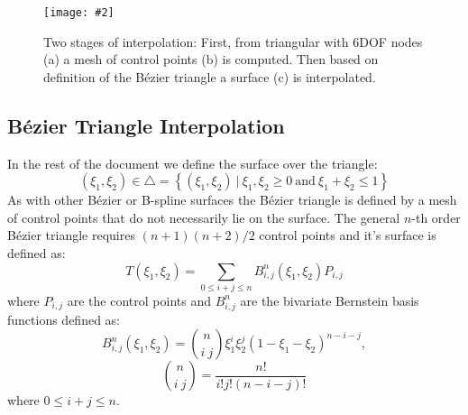\documentclass{egpubl}
\newcommand{\FigureW}[3]{%
\begin{figure*}[htb]
  \centering
  \texttt{[image: \#2]}
  \caption{\label{fig-#2}#3}
\end{figure*}}
\begin{document}
\FigureW{0.8\linewidth}{stages}
{Two stages of interpolation: First, from triangular with 6DOF nodes (a) a mesh of control points (b) is computed.
Then based on definition of the B\'ezier triangle a surface (c) is interpolated.}

\subsection{B\'ezier Triangle Interpolation} %

In the rest of the document we define the surface over the triangle:
%
\begin{equation}
    (\xi_1,\xi_2) \in \bigtriangleup = \left\{ (\xi_1,\xi_2)~|~\xi_1, \xi_2 \ge 0
        \mathrm{~and~} \xi_1+\xi_2 \le 1 \right\}
\end{equation}
%
As with other B\'ezier or B-spline surfaces the B\'ezier triangle is
defined by a mesh of control points that do not necessarily lie on the
surface. The general $n$-th order B\'ezier triangle requires $(n + 1)(n +
2)/2$ control points and it's surface is defined as:
%
\begin{equation}
    T(\xi_1, \xi_2) = \sum_{0 \le i + j \le n} B^n_{i,j}(\xi_1,\xi_2) P_{i,j}
\end{equation}
%
where $P_{i,j}$ are the control points and $B^n_{i,j}$ are the bivariate
Bernstein basis functions defined as:
%
\begin{equation}
  B^n_{i,j} (\xi_1,\xi_2) =
    \binom{n}{i~j} \xi_1^i \xi_2^j (1-\xi_1-\xi_2)^{n-i-j},
\end{equation}
\begin{equation}
  \binom{n}{i~j} = \frac{n!}{i!j!(n-i-j)!}
\end{equation}
%
where $ 0 \le i+j \le n $.
\end{document}
